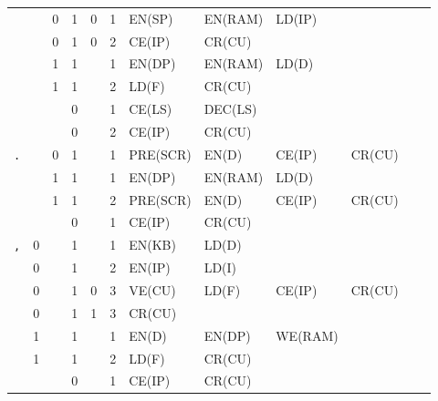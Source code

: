 \begin{landscape}
\begin{longtable}[c] {c|cccc|c|llllll}
    \rowcolor{Gray}               &   & 0 & 1     & 0    & 1     & EN(SP)   & EN(RAM)  & LD(IP)  &        &        &        \\
    \rowcolor{Gray}               &   & 0 & 1     & 0    & 2     & CE(IP)   & CR(CU)   &         &        &        &        \\
    \rowcolor{White}              &   & 1 & 1     &      & 1     & EN(DP)   & EN(RAM)  & LD(D)   &        &        &        \\
    \rowcolor{White}              &   & 1 & 1     &      & 2     & LD(F)    & CR(CU)   &         &        &        &        \\
    \rowcolor{Gray}               &   &   & 0     &      & 1     & CE(LS)   & DEC(LS)  &         &        &        &        \\ 
    \rowcolor{Gray}               &   &   & 0     &      & 2     & CE(IP)   & CR(CU)   &         &        &        &        \\ \hline
    
    \rowcolor{Gray}  \texttt{.}   &   & 0 & 1     &      & 1     & PRE(SCR) & EN(D)    & CE(IP)  & CR(CU) &        &        \\
    \rowcolor{White}              &   & 1 & 1     &      & 1     & EN(DP)   & EN(RAM)  & LD(D)   &        &        &        \\
    \rowcolor{White}              &   & 1 & 1     &      & 2     & PRE(SCR) & EN(D)    & CE(IP)  & CR(CU) &        &        \\
    \rowcolor{Gray}               &   &   & 0     &      & 1     & CE(IP)   & CR(CU)   &         &        &        &        \\ \hline
    
    \rowcolor{White} \texttt{,}   & 0 &   & 1     &      & 1     & EN(KB)   & LD(D)    &         &        &        &        \\
    \rowcolor{White}              & 0 &   & 1     &      & 2     & EN(IP)   & LD(I)    &         &        &        &        \\
    \rowcolor{Gray}               & 0 &   & 1     & 0    & 3     & VE(CU)   & LD(F)    & CE(IP)  & CR(CU) &        &        \\
    \rowcolor{White}              & 0 &   & 1     & 1    & 3     & CR(CU)   &          &         &        &        &        \\   
    \rowcolor{Gray}               & 1 &   & 1     &      & 1     & EN(D)    & EN(DP)   & WE(RAM) &        &        &        \\
    \rowcolor{Gray}               & 1 &   & 1     &      & 2     & LD(F)    & CR(CU)   &         &        &        &        \\
    \rowcolor{White}              &   &   & 0     &      & 1     & CE(IP)   & CR(CU)   &         &        &        &        \\ \hline
    

\end{longtable}
\end{landscape}

